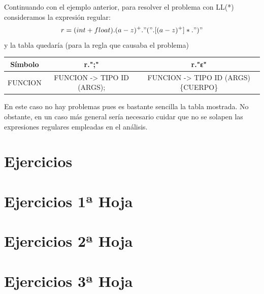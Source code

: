 \documentclass{apuntes}
\begin{document}
Continuando con el ejemplo anterior, para resolver el problema con LL(*) consideramos la expresión regular:
\[r=(int+float).(a-z)^+."(".[(a-z)^+]*.")"\]
y la tabla quedaría (para la regla que causaba el problema)
\begin{center}
\begin{tabular}{| c | c | c |}
\hline
Símbolo & r.";" & r."ε" \\
\hline
FUNCION & FUNCION -> TIPO ID (ARGS); &  FUNCION -> TIPO ID (ARGS) \{CUERPO\} \\
\hline
\end{tabular}
\end{center}
En este caso no hay problemas pues es bastante sencilla la tabla mostrada. No obstante, en un caso más general sería necesario cuidar que no se solapen las expresiones regulares empleadas en el análisis.

\appendix
\chapter{Ejercicios}


\chapter{Ejercicios 1ª Hoja}


\chapter{Ejercicios 2ª Hoja}


\chapter{Ejercicios 3ª Hoja}



\printindex
\end{document}
